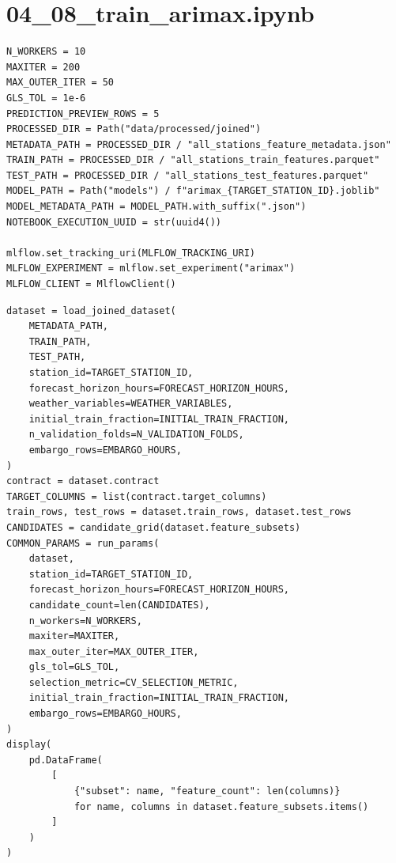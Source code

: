 \section{04\_08\_train\_arimax.ipynb}

\begin{verbatim}
N_WORKERS = 10
MAXITER = 200
MAX_OUTER_ITER = 50
GLS_TOL = 1e-6
PREDICTION_PREVIEW_ROWS = 5
PROCESSED_DIR = Path("data/processed/joined")
METADATA_PATH = PROCESSED_DIR / "all_stations_feature_metadata.json"
TRAIN_PATH = PROCESSED_DIR / "all_stations_train_features.parquet"
TEST_PATH = PROCESSED_DIR / "all_stations_test_features.parquet"
MODEL_PATH = Path("models") / f"arimax_{TARGET_STATION_ID}.joblib"
MODEL_METADATA_PATH = MODEL_PATH.with_suffix(".json")
NOTEBOOK_EXECUTION_UUID = str(uuid4())

mlflow.set_tracking_uri(MLFLOW_TRACKING_URI)
MLFLOW_EXPERIMENT = mlflow.set_experiment("arimax")
MLFLOW_CLIENT = MlflowClient()
\end{verbatim}

\begin{verbatim}
dataset = load_joined_dataset(
    METADATA_PATH,
    TRAIN_PATH,
    TEST_PATH,
    station_id=TARGET_STATION_ID,
    forecast_horizon_hours=FORECAST_HORIZON_HOURS,
    weather_variables=WEATHER_VARIABLES,
    initial_train_fraction=INITIAL_TRAIN_FRACTION,
    n_validation_folds=N_VALIDATION_FOLDS,
    embargo_rows=EMBARGO_HOURS,
)
contract = dataset.contract
TARGET_COLUMNS = list(contract.target_columns)
train_rows, test_rows = dataset.train_rows, dataset.test_rows
CANDIDATES = candidate_grid(dataset.feature_subsets)
COMMON_PARAMS = run_params(
    dataset,
    station_id=TARGET_STATION_ID,
    forecast_horizon_hours=FORECAST_HORIZON_HOURS,
    candidate_count=len(CANDIDATES),
    n_workers=N_WORKERS,
    maxiter=MAXITER,
    max_outer_iter=MAX_OUTER_ITER,
    gls_tol=GLS_TOL,
    selection_metric=CV_SELECTION_METRIC,
    initial_train_fraction=INITIAL_TRAIN_FRACTION,
    embargo_rows=EMBARGO_HOURS,
)
display(
    pd.DataFrame(
        [
            {"subset": name, "feature_count": len(columns)}
            for name, columns in dataset.feature_subsets.items()
        ]
    )
)
\end{verbatim}

